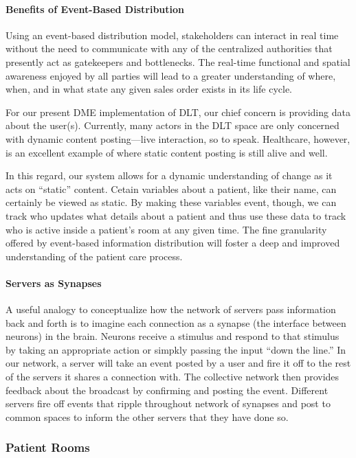 \documentclass[letterpaper]{article}
\begin{document}
    \paragraph{Benefits of Event-Based Distribution}
    Using an event-based distribution model, stakeholders can interact in real time without the need to communicate with any of the centralized authorities that presently act as gatekeepers and bottlenecks. The real-time functional and spatial awareness enjoyed by all parties will lead to a greater understanding of where, when, and in what state any given sales order exists in its life cycle.

    For our present DME implementation of DLT, our chief concern is providing data about the user(s). Currently, many actors in the DLT space are only concerned with dynamic content posting---live interaction, so to speak. Healthcare, however, is an excellent example of where static content posting is still alive and well.

    In this regard, our system allows for a dynamic understanding of change as it acts on ``static'' content. Cetain variables about a patient, like their name, can certainly be viewed as static. By making these variables event, though, we can track who updates what details about a patient and thus use these data to track who is active inside a patient's room at any given time. The fine granularity offered by event-based information distribution will foster a deep and improved understanding of the patient care process.
%
    \paragraph{Servers as Synapses}
    A useful analogy to conceptualize how the network of servers pass information back and forth is to imagine each connection as a synapse (the interface between neurons) in the brain. Neurons receive a stimulus and respond to that stimulus by taking an appropriate action or simpkly passing the input ``down the line.''
%
    In our network, a server will take an event posted by a user and fire it off to the rest of the servers it shares a connection with. The collective network then provides feedback about the broadcast by confirming and posting the event. Different servers fire off events that ripple throughout network of synapses and post to common spaces to inform the other servers that they have done so.
%
  \subsubsection{Patient Rooms}
\end{document}
